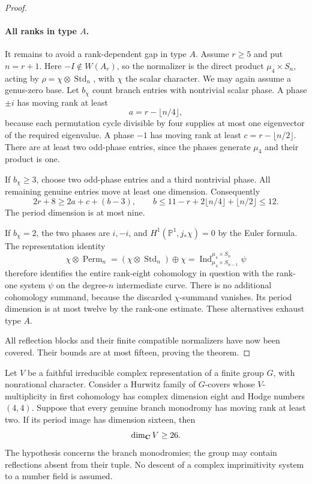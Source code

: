 \begin{proof}
\paragraph{All ranks in type $A$.}
It remains to avoid a rank-dependent gap in type $A$.
Assume $r\ge5$ and put $n=r+1$. Here $-I\notin W(A_r)$, so the
normalizer is the direct product $\mu_4\times S_n$, acting by
$\rho=\chi\otimes\operatorname{Std}_n$, with $\chi$ the scalar character.
We may again assume a genus-zero base. Let $b_\chi$ count branch
entries with nontrivial scalar phase. A phase $\pm i$ has moving
rank at least
\[
 a=r-\lfloor n/4\rfloor,
\]
because each permutation cycle divisible by four supplies at most
one eigenvector of the required eigenvalue. A phase $-1$ has moving
rank at least $c=r-\lfloor n/2\rfloor$. There are at least two
odd-phase entries, since the phases generate $\mu_4$ and their
product is one.

If $b_\chi\ge3$, choose two odd-phase entries and a third nontrivial
phase. All remaining genuine entries move at least one dimension.
Consequently
\[
 2r+8\ge2a+c+(b-3),\qquad
 b\le11-r+2\lfloor n/4\rfloor+\lfloor n/2\rfloor\le12.
\]
The period dimension is at most nine.

If $b_\chi=2$, the two phases are $i,-i$, and
$H^1(\mathbb P^1,j_*\chi)=0$ by the Euler formula. The representation identity
\[
 \chi\otimes\operatorname{Perm}_n
  =(\chi\otimes\operatorname{Std}_n)\oplus\chi
  =\operatorname{Ind}_{\mu_4\times S_{n-1}}^{\mu_4\times S_n}\psi
\]
therefore identifies the entire rank-eight cohomology in question
with the rank-one system $\psi$ on the degree-$n$
intermediate curve. There is no additional cohomology summand,
because the discarded $\chi$-summand vanishes. Its period dimension
is at most twelve by the rank-one estimate. These alternatives exhaust type $A$.

All reflection blocks and their finite compatible normalizers have
now been covered. Their bounds are at most fifteen, proving the theorem.
\end{proof}

\begin{theorem}\label{thm:finite-cover-rank}
Let $V$ be a faithful irreducible complex representation of a finite group $G$, with nonrational character. Consider a Hurwitz family of $G$-covers whose $V$-multiplicity in first cohomology has complex dimension eight and Hodge numbers $(4,4)$. Suppose that every genuine branch monodromy has moving rank at least two. If its period image has dimension sixteen, then
\[
 \dim_{\mathbf C}V\ge26.
\]
The hypothesis concerns the branch monodromies; the group may contain reflections absent from their tuple. No descent of a complex imprimitivity system to a number field is assumed.
\end{theorem}

